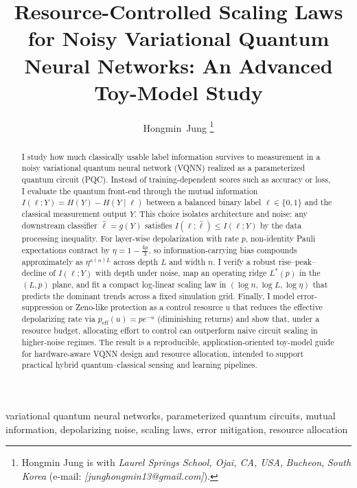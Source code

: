 \documentclass[journal]{IEEEtran}
\title{Resource-Controlled Scaling Laws for Noisy Variational Quantum Neural Networks: An Advanced Toy-Model Study}
\author{Hongmin~Jung%
\thanks{Hongmin Jung is with \emph{Laurel Springs School, Ojai, CA, USA}, \emph{Bucheon}, \emph{South Korea} (e-mail: \emph{[junghongmin13@gmail.com]}).}}
\newcommand{\MI}{I(\ell;Y)}
\newcommand{\peff}{p_{\mathrm{eff}}(u)}
\begin{document}
\setcounter{topnumber}{2}
\setcounter{dbltopnumber}{2}
\renewcommand{\topfraction}{0.9}
\renewcommand{\dbltopfraction}{0.9}
\renewcommand{\textfraction}{0.1}
\renewcommand{\floatpagefraction}{0.8}
\renewcommand{\dblfloatpagefraction}{0.8}

\maketitle

\begin{abstract}
I study how much classically usable label information survives to measurement in a noisy variational quantum neural network (VQNN) realized as a parameterized quantum circuit (PQC). Instead of training-dependent scores such as accuracy or loss, I evaluate the quantum front-end through the mutual information $\MI=H(Y)-H(Y\mid \ell)$ between a balanced binary label $\ell\in\{0,1\}$ and the classical measurement output $Y$. This choice isolates architecture and noise: any downstream classifier $\hat{\ell}=g(Y)$ satisfies $I(\ell;\hat{\ell})\le \MI$ by the data processing inequality. For layer-wise depolarization with rate $p$, non-identity Pauli expectations contract by $\eta=1-\tfrac{4p}{3}$, so information-carrying bias compounds approximately as $\eta^{\kappa(n)L}$ across depth $L$ and width $n$. I verify a robust rise--peak--decline of $\MI$ with depth under noise, map an operating ridge $L^{\ast}(p)$ in the $(L,p)$ plane, and fit a compact log-linear scaling law in $(\log n,\log L,\log\eta)$ that predicts the dominant trends across a fixed simulation grid. Finally, I model error-suppression or Zeno-like protection as a control resource $u$ that reduces the effective depolarizing rate via $\peff=p e^{-u}$ (diminishing returns) and show that, under a resource budget, allocating effort to control can outperform naive circuit scaling in higher-noise regimes. The result is a reproducible, application-oriented toy-model guide for hardware-aware VQNN design and resource allocation, intended to support practical hybrid quantum--classical sensing and learning pipelines.
\end{abstract}

\begin{IEEEkeywords}
variational quantum neural networks, parameterized quantum circuits, mutual information, depolarizing noise, scaling laws, error mitigation, resource allocation
\end{IEEEkeywords}
\end{document}

